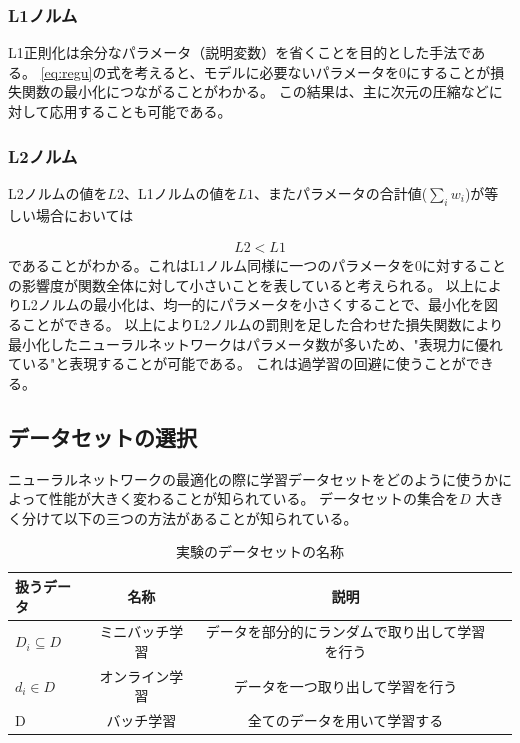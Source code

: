 \subsubsection{L1ノルム}
L1正則化は余分なパラメータ（説明変数）を省くことを目的とした手法である。
\ref{eq:regu}の式を考えると、モデルに必要ないパラメータを$ 0 $にすることが損失関数の最小化につながることがわかる。
この結果は、主に次元の圧縮などに対して応用することも可能である。

\subsubsection{L2ノルム}
L2ノルムの値を$ L2 $、L1ノルムの値を$ L1 $、またパラメータの合計値($ \sum_i w_i $)が等しい場合においては

\begin{eqnarray}
L2 < L1
\label{eq:norm uneq}
\end{eqnarray}
であることがわかる。これはL1ノルム同様に一つのパラメータを$ 0 $に対することの影響度が関数全体に対して小さいことを表していると考えられる。
以上によりL2ノルムの最小化は、均一的にパラメータを小さくすることで、最小化を図ることができる。
以上によりL2ノルムの罰則を足した合わせた損失関数により最小化したニューラルネットワークはパラメータ数が多いため、"表現力に優れている"と表現することが可能である。
これは過学習の回避に使うことができる。


\subsection{データセットの選択}
ニューラルネットワークの最適化の際に学習データセットをどのように使うかによって性能が大きく変わることが知られている。
データセットの集合を$ D $ 大きく分けて以下の三つの方法があることが知られている。

\begin{table}[htbp]
    \begin{center}
        \caption{実験のデータセットの名称}
        \vspace{5mm} 
        \begin{tabular}{l*{2}{c}r}
        扱うデータ      & 名称 & 説明 \\
        \hline
        $ D_i \subseteq D $          & ミニバッチ学習  & データを部分的にランダムで取り出して学習を行う \\
        $ d_i \in D $                & オンライン学習 & データを一つ取り出して学習を行う  \\
        D        & バッチ学習 & 全てのデータを用いて学習する \\
        \end{tabular}
    \end{center}
\end{table}

